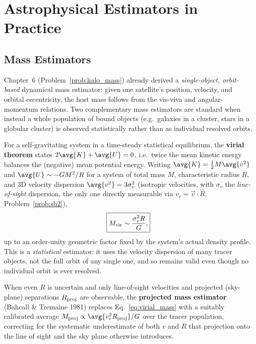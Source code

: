 \section{Astrophysical Estimators in Practice}

\subsection{Mass Estimators}

Chapter~6 (Problem~\ref{prob:halo_mass}) already derived a \emph{single-object, orbit-based} dynamical mass estimator: given one satellite's position, velocity, and orbital eccentricity, the host mass follows from the vis-viva and angular-momentum relations. Two complementary mass estimators are standard when instead a whole population of bound objects (e.g.\ galaxies in a cluster, stars in a globular cluster) is observed statistically rather than as individual resolved orbits.

\begin{result}
	For a self-gravitating system in a time-steady statistical equilibrium, the \textbf{virial theorem} states $2\avg{K}+\avg{U}=0$, i.e.\ twice the mean kinetic energy balances the (negative) mean potential energy. Writing $\avg{K}=\tfrac12 M\avg{v^2}$ and $\avg{U}\sim-GM^2/R$ for a system of total mass $M$, characteristic radius $R$, and 3D velocity dispersion $\avg{v^2}=3\sigma_v^2$ (isotropic velocities, with $\sigma_v$ the \emph{line-of-sight} dispersion, the only one directly measurable via $v_r=\vec v\cdot\hat R$, Problem~\ref{prob:sb2}),
	\begin{equation}
		\boxed{M_{\rm vir} \sim \frac{\sigma_v^2 R}{G},}
		\label{eq:virial_mass}
	\end{equation}
	up to an order-unity geometric factor fixed by the system's actual density profile. This is a \emph{statistical} estimator: it uses the velocity dispersion of many tracer objects, not the full orbit of any single one, and so remains valid even though no individual orbit is ever resolved.
\end{result}

When even $R$ is uncertain and only line-of-sight velocities and projected (sky-plane) separations $R_{\rm proj}$ are observable, the \textbf{projected mass estimator} (Bahcall \& Tremaine 1981) replaces Eq.~\eqref{eq:virial_mass} with a suitably calibrated average $M_{\rm proj}\propto\avg{v_r^2 R_{\rm proj}}/G$ over the tracer population, correcting for the systematic underestimate of both $v$ and $R$ that projection onto the line of sight and the sky plane otherwise introduces.

